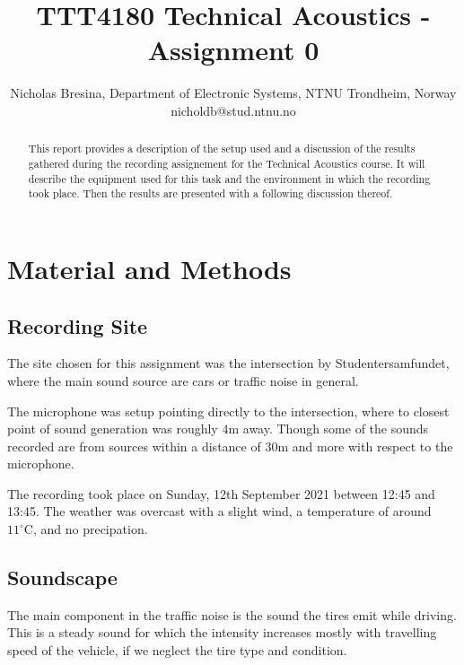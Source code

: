 \documentclass[twocolumn]{article}
\begin{document}
\title{TTT4180 Technical Acoustics - Assignment 0}

\author{Nicholas Bresina, Department of Electronic Systems, NTNU Trondheim, Norway \\
nicholdb@stud.ntnu.no}

\maketitle\thispagestyle{empty}

\begin{abstract}
This report provides a description of the setup used and a discussion of the results gathered during the
recording assignement for the Technical Acoustics course.
It will describe the equipment used for this task and the environment in which the recording took place.
Then the results are presented with a following discussion thereof.
\end{abstract}

\section{Material and Methods}
\subsection{Recording Site}
The site chosen for this assignment was the intersection by Studentersamfundet, where the main sound source
are cars or traffic noise in general.

The microphone was setup pointing directly to the intersection, where to closest point of sound generation
was roughly $4\textrm{m}$ away.
Though some of the sounds recorded are from sources within a distance of $30\textrm{m}$ and more with respect
to the microphone.

The recording took place on Sunday, 12th September 2021 between 12:45 and 13:45.
The weather was overcast with a slight wind, a temperature of around $11^\circ\textrm{C}$,
and no precipation.

\subsection{Soundscape}
The main component in the traffic noise is the sound the tires emit while driving.
This is a steady sound for which the intensity increases mostly with travelling speed of the vehicle, if we
neglect the tire type and condition.
\end{document}
